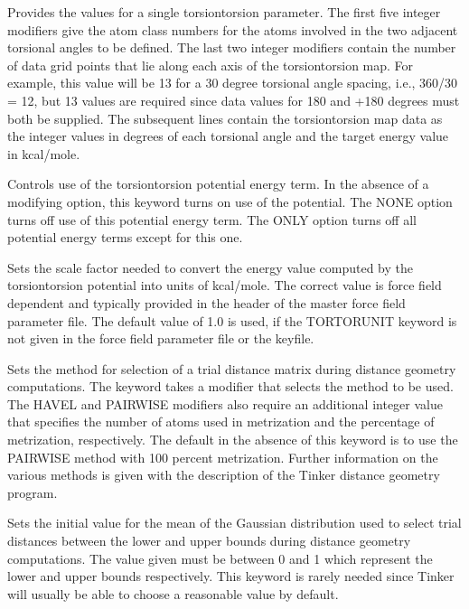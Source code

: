 \documentclass[letterpaper,11pt,english]{sphinxmanual}
\begin{document}
  Provides the values for a single torsion\sphinxhyphen{}torsion parameter. The first five integer modifiers give the atom class numbers for the atoms involved in the two adjacent torsional angles to be defined. The last two integer modifiers contain the number of data grid points that lie along each axis of the torsion\sphinxhyphen{}torsion map. For example, this value will be 13 for a 30 degree torsional angle spacing, i.e., 360/30 = 12, but 13 values are required since data values for \sphinxhyphen{}180 and +180 degrees must both be supplied. The subsequent lines contain the torsion\sphinxhyphen{}torsion map data as the integer values in degrees of each torsional angle and the target energy value in kcal/mole.

  Controls use of the torsion\sphinxhyphen{}torsion potential energy term. In the absence of a modifying option, this keyword turns on use of the potential. The NONE option turns off use of this potential energy term. The ONLY option turns off all potential energy terms except for this one.

  Sets the scale factor needed to convert the energy value computed by the torsion\sphinxhyphen{}torsion potential into units of kcal/mole. The correct value is force field dependent and typically provided in the header of the master force field parameter file. The default value of 1.0 is used, if the TORTORUNIT keyword is not given in the force field parameter file or the keyfile.

  Sets the method for selection of a trial distance matrix during distance geometry computations. The keyword takes a modifier that selects the method to be used. The HAVEL and PAIRWISE modifiers also require an additional integer value that specifies the number of atoms used in metrization and the percentage of metrization, respectively. The default in the absence of this keyword is to use the PAIRWISE method with 100 percent metrization. Further information on the various methods is given with the description of the Tinker distance geometry program.

  Sets the initial value for the mean of the Gaussian distribution used to select trial distances between the lower and upper bounds during distance geometry computations. The value given must be between 0 and 1 which represent the lower and upper bounds respectively. This keyword is rarely needed since Tinker will usually be able to choose a reasonable value by default.
\end{document}
